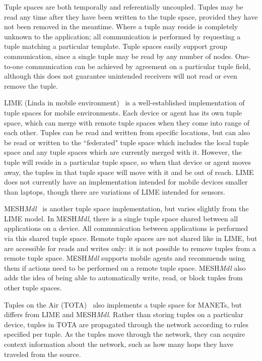 Tuple spaces are both temporally and referentially uncoupled. Tuples may be read any time after they have been written to the tuple space, provided they have not been removed in the meantime. Where a tuple may reside is completely unknown to the application; all communication is performed by requesting a tuple matching a particular template. Tuple spaces easily support group communication, since a single tuple may be read by any number of nodes. One-to-one communication can be achieved by agreement on a particular tuple field, although this does not guarantee unintended receivers will not read or even remove the tuple.

LIME (Linda in mobile environment)~\cite{lime} is a well-established implementation of tuple spaces\cite{linda} for mobile environments. Each device or agent has its own tuple space, which can merge with remote tuple spaces when they come into range of each other. Tuples can be read and written from specific locations, but can also be read or written to the ``federated" tuple space which includes the local tuple space and any tuple spaces which are currently merged with it. However, the tuple will reside in a particular tuple space, so when that device or agent moves away, the tuples in that tuple space will move with it and be out of reach. LIME does not currently have an implementation intended for mobile devices smaller than laptops, though there are variations of LIME intended for sensors.

MESH\textit{Mdl}~\cite{meshmdl}  is another tuple space implementation, but varies slightly from the LIME model. In MESH\textit{Mdl}, there is a single tuple space shared between all applications on a device. All communication between applications is performed via  this shared tuple space. Remote tuple spaces are not shared like in LIME, but are accessible for reads and writes only: it is not possible to remove tuples from a remote tuple space. MESH\textit{Mdl} supports mobile agents and recommends using them if actions need to be performed on a remote tuple space. MESH\textit{Mdl} also adds the idea of being able to automatically write, read, or block tuples from other tuple spaces.

Tuples on the Air (TOTA)~\cite{tota}  also implements a tuple space for MANETs, but differs from LIME and MESH\textit{Mdl}. Rather than storing tuples on a particular device, tuples in TOTA are propagated through the network according to rules specified per tuple. As the tuples move through the network, they can acquire context information about the network, such as how many hops they have traveled from the source.

